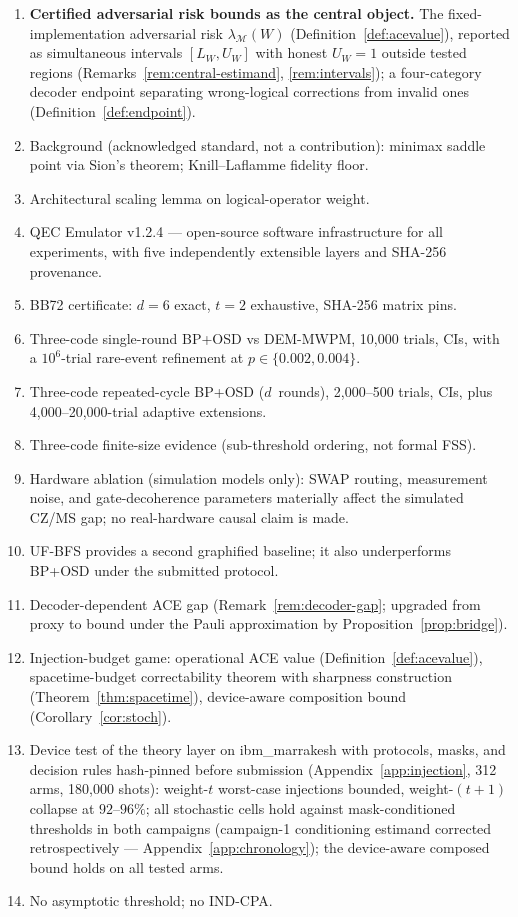 \documentclass[11pt,a4paper]{article}
\begin{document}
\begin{enumerate}[leftmargin=1.6em,label=(\roman*)]
  \item \textbf{Certified adversarial risk bounds as the central object.}
    The fixed-implementation adversarial risk
    $\lambda_{\mathcal{M}}(W)$ (Definition~\ref{def:acevalue}), reported
    as simultaneous intervals $[L_W,U_W]$ with honest $U_W=1$ outside
    tested regions (Remarks~\ref{rem:central-estimand},
    \ref{rem:intervals}); a four-category decoder endpoint separating
    wrong-logical corrections from invalid ones
    (Definition~\ref{def:endpoint}).
  \item Background (acknowledged standard, not a contribution): minimax
    saddle point via Sion's theorem; Knill--Laflamme fidelity floor.
  \item Architectural scaling lemma on logical-operator weight.
  \item QEC Emulator v1.2.4 --- open-source software infrastructure for all
    experiments, with five independently extensible layers and SHA-256 provenance.
  \item BB72 certificate: $d=6$ exact, $t=2$ exhaustive, SHA-256 matrix pins.
  \item Three-code single-round BP+OSD vs DEM-MWPM, 10{,}000 trials, CIs,
    with a $10^{6}$-trial rare-event refinement at $p\in\{0.002,0.004\}$.
  \item Three-code repeated-cycle BP+OSD ($d$~rounds), 2{,}000--500 trials, CIs,
    plus 4{,}000--20{,}000-trial adaptive extensions.
  \item Three-code finite-size evidence (sub-threshold ordering, not formal FSS).
  \item Hardware ablation (simulation models only): SWAP routing, measurement noise, and gate-decoherence parameters materially affect the simulated CZ/MS gap; no real-hardware causal claim is made.
  \item UF-BFS provides a second graphified baseline; it also underperforms BP+OSD under the submitted protocol.
  \item Decoder-dependent ACE gap (Remark~\ref{rem:decoder-gap}; upgraded from
    proxy to bound under the Pauli approximation by
    Proposition~\ref{prop:bridge}).
  \item Injection-budget game: operational ACE value
    (Definition~\ref{def:acevalue}), spacetime-budget correctability theorem
    with sharpness construction (Theorem~\ref{thm:spacetime}), device-aware
    composition bound (Corollary~\ref{cor:stoch}).
  \item Device test of the theory layer on ibm\_marrakesh with
    protocols, masks, and decision rules hash-pinned before submission
    (Appendix~\ref{app:injection}, 312 arms, 180{,}000 shots): weight-$t$
    worst-case injections bounded, weight-$(t{+}1)$ collapse at
    $92$--$96\%$; all stochastic cells hold against mask-conditioned
    thresholds in both campaigns (campaign-1 conditioning estimand
    corrected retrospectively --- Appendix~\ref{app:chronology}); the
    device-aware composed bound holds on all tested arms.
  \item No asymptotic threshold; no IND-CPA.
\end{enumerate}
\end{document}
